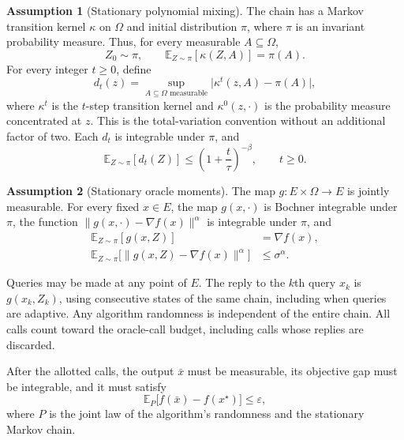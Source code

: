 \documentclass[10pt]{article}
\theoremstyle{definition}
\newtheorem{assumption}{Assumption}
\begin{document}
\begin{assumption}[Stationary polynomial mixing]
The chain has a Markov transition kernel $\kappa$ on $\Omega$ and initial distribution $\pi$, where $\pi$ is an invariant probability measure. Thus, for every measurable $A\subseteq\Omega$,
\[
Z_0\sim\pi,
\qquad
\mathbb{E}_{Z\sim\pi}[\kappa(Z,A)]=\pi(A).
\]
For every integer $t\geq0$, define
\[
d_t(z)=\sup_{A\subseteq\Omega\text{ measurable}}
\bigl|\kappa^t(z,A)-\pi(A)\bigr|,
\]
where $\kappa^t$ is the $t$-step transition kernel and $\kappa^0(z,\cdot)$ is the probability measure concentrated at $z$. This is the total-variation convention without an additional factor of two. Each $d_t$ is integrable under $\pi$, and
\[
\mathbb{E}_{Z\sim\pi}[d_t(Z)]
\leq\left(1+\frac{t}{\tau}\right)^{-\beta},
\qquad t\geq0.
\]
\end{assumption}

\begin{assumption}[Stationary oracle moments]
The map $g:E\times\Omega\to E$ is jointly measurable. For every fixed $x\in E$, the map $g(x,\cdot)$ is Bochner integrable under $\pi$, the function $\|g(x,\cdot)-\nabla f(x)\|^\alpha$ is integrable under $\pi$, and
\[
\begin{aligned}
\mathbb{E}_{Z\sim\pi}[g(x,Z)]&=\nabla f(x),\\
\mathbb{E}_{Z\sim\pi}
\bigl[\|g(x,Z)-\nabla f(x)\|^\alpha\bigr]
&\leq\sigma^\alpha.
\end{aligned}
\]
\end{assumption}

Queries may be made at any point of $E$. The reply to the $k$th query $x_k$ is $g(x_k,Z_k)$, using consecutive states of the same chain, including when queries are adaptive. Any algorithm randomness is independent of the entire chain. All calls count toward the oracle-call budget, including calls whose replies are discarded.

After the allotted calls, the output $\bar{x}$ must be measurable, its objective gap must be integrable, and it must satisfy
\[
\mathbb{E}_{P}\bigl[f(\bar{x})-f(x^\star)\bigr]
\leq\varepsilon,
\]
where $P$ is the joint law of the algorithm's randomness and the stationary Markov chain.
\end{document}
